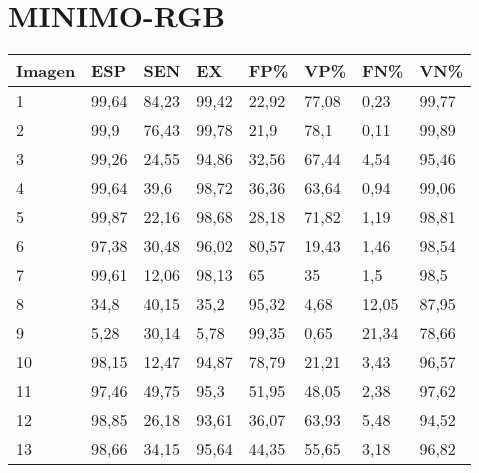 \section{MINIMO-RGB}
\begin{longtable}[c]{|l|l|l|l|l|l|l|l|}
\hline
\textbf{Imagen} & \textbf{ESP} & \textbf{SEN} & \textbf{EX} & \textbf{FP\%} & \textbf{VP\%} & \textbf{FN\%} & \textbf{VN\%} \\ \hline
\endfirsthead
%
\endhead
%
1               & 99,64        & 84,23        & 99,42       & 22,92         & 77,08         & 0,23          & 99,77         \\ \hline
2               & 99,9         & 76,43        & 99,78       & 21,9          & 78,1          & 0,11          & 99,89         \\ \hline
3               & 99,26        & 24,55        & 94,86       & 32,56         & 67,44         & 4,54          & 95,46         \\ \hline
4               & 99,64        & 39,6         & 98,72       & 36,36         & 63,64         & 0,94          & 99,06         \\ \hline
5               & 99,87        & 22,16        & 98,68       & 28,18         & 71,82         & 1,19          & 98,81         \\ \hline
6               & 97,38        & 30,48        & 96,02       & 80,57         & 19,43         & 1,46          & 98,54         \\ \hline
7               & 99,61        & 12,06        & 98,13       & 65            & 35            & 1,5           & 98,5          \\ \hline
8               & 34,8         & 40,15        & 35,2        & 95,32         & 4,68          & 12,05         & 87,95         \\ \hline
9               & 5,28         & 30,14        & 5,78        & 99,35         & 0,65          & 21,34         & 78,66         \\ \hline
10              & 98,15        & 12,47        & 94,87       & 78,79         & 21,21         & 3,43          & 96,57         \\ \hline
11              & 97,46        & 49,75        & 95,3        & 51,95         & 48,05         & 2,38          & 97,62         \\ \hline
12              & 98,85        & 26,18        & 93,61       & 36,07         & 63,93         & 5,48          & 94,52         \\ \hline
13              & 98,66        & 34,15        & 95,64       & 44,35         & 55,65         & 3,18          & 96,82         \\ \hline

\end{longtable}
